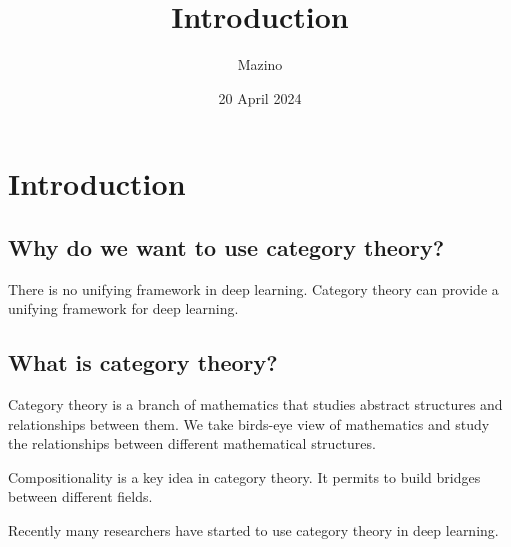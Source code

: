 \documentclass{article}
\title{Introduction}
\author{Mazino}
\date{20 April 2024}
\begin{document}
\maketitle

\section{Introduction}

\subsection{Why do we want to use category theory?}

There is no unifying framework in deep learning.
Category theory can provide a unifying framework for deep learning.

\subsection{What is category theory?}

Category theory is a branch of mathematics that studies abstract structures and relationships between them.  We take  birds-eye view of mathematics and study the relationships between different mathematical structures.

Compositionality is a key idea in category theory. It permits to build bridges between different fields.

Recently many researchers have started to use category theory in deep learning.
\end{document}
